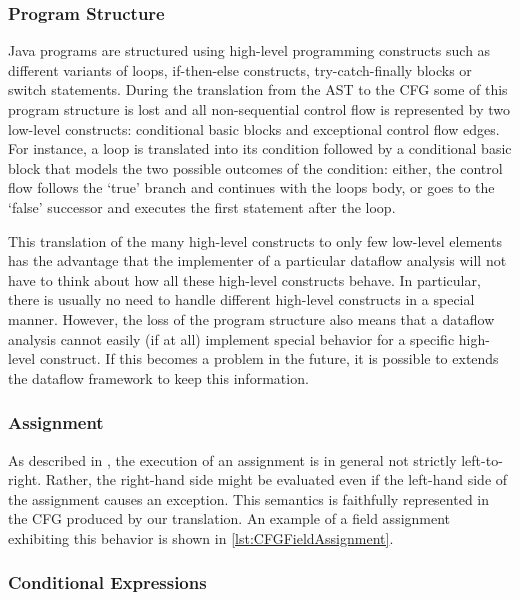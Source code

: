 \subsubsection{Program Structure}

Java programs are structured using high-level programming constructs such as
different variants of loops, if-then-else constructs, try-catch-finally blocks
or switch statements.  During the translation from the AST to the CFG some
of this program structure is lost and all non-sequential control flow is
represented by two low-level constructs: conditional basic blocks and exceptional
control flow edges. For instance, a  loop is translated
into its condition followed by a conditional basic block that models the two
possible outcomes of the condition: either, the control flow follows the
`true' branch and continues with the loops body, or goes to the `false'
successor and executes the first statement after the loop.

This translation of the many high-level constructs to only few low-level
elements has the advantage that the implementer of a particular dataflow
analysis will not have to think about how all these high-level constructs
behave. In particular, there is usually no need to handle different high-level
constructs in a special manner. However, the loss of the program structure
also means that a dataflow analysis cannot easily (if at all) implement special behavior
for a specific high-level construct. If this becomes a problem in the future,
it is possible to extends the dataflow framework to keep this information.



\subsubsection{Assignment}

As described in , the execution of an assignment is in general
not strictly left-to-right. Rather, the right-hand side might be evaluated even
if the left-hand side of the assignment causes an exception. This semantics is faithfully
represented in the CFG produced by our translation.
An example of a field assignment exhibiting this behavior is shown in \autoref{lst:CFGFieldAssignment}.



\subsubsection{Conditional Expressions}
\label{sec:cond-exp}

